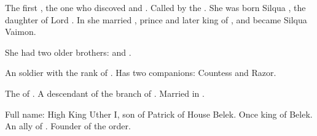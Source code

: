\begin{gloss}
\begin{comment}
\paragraph{Silqua Vaimon}
\end{comment}
The first , the one who discoved  and . 
Called  by the . 
She was born Silqua \Delaen, the daughter of Lord . 
In  she married , prince and later king of {\Imrath}, and became Silqua Vaimon. 

She had two older brothers: 
 and . 







\begin{comment}
\paragraph{Telcastora Ilcas}
\end{comment}
An  soldier with the rank of {\IlcasStartRank}. 
Has two  companions: Countess and Razor. 







\begin{comment}
\paragraph{\Tiroco{} Pelidor}
\end{comment}
The \rinyuth of . 
A descendant of the \Forkliner{} branch of . 
Married  in . 







\begin{comment}
\paragraph{Uther the Tiger}
\end{comment}
Full name: High King Uther I, son of Patrick of House Belek. 
Once king of Belek. 
An ally of . 
Founder of the  order. 



\end{gloss}
